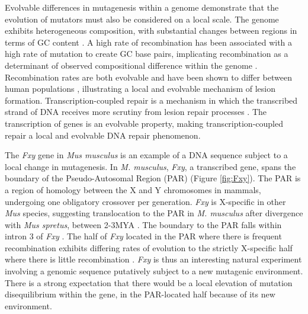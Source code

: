 Evolvable differences in mutagenesis within a genome demonstrate that the evolution of mutators must also be considered on a local scale. The genome exhibits heterogeneous composition, with substantial changes between regions in terms of GC content \citep{Bernardi1989TheGenome, Bernardi2000IsochoresVertebrates}. A high rate of recombination has been associated with a high rate of mutation to create GC base pairs, implicating recombination as a determinant of observed compositional difference within the genome \citep{Montoya-Burgos2003RecombinationGenomes, Duret2006AEvolution}. Recombination rates are both evolvable and have been shown to differ between human populations \citep{Wegmann2011RecombinationInference}, illustrating a local and evolvable mechanism of lesion formation. Transcription-coupled repair is a mechanism in which the transcribed strand of DNA receives more scrutiny from lesion repair processes \citep{Touchon2003Transcription-coupledGenome}. The transcription of genes is an evolvable property, making transcription-coupled repair a local and evolvable DNA repair phenomenon. 

The \textit{Fxy} gene in \textit{Mus musculus} is an example of a DNA sequence subject to a local change in mutagenesis. In \textit{M. musculus}, \textit{Fxy}, a transcribed gene, spans the boundary of the \gls{Pseudo-Autosomal Region} (PAR) \citep{Palmer1997AMice} (Figure \ref{fig:Fxy}). The PAR is a region of homology between the X and Y chromosomes in mammals, undergoing one obligatory crossover per generation. \textit{Fxy} is X-specific in other \textit{Mus} species, suggesting translocation to the PAR in \textit{M. musculus} after divergence with \textit{Mus spretus}, between 2-3MYA \citep{Huang2005HowMammals}. The boundary to the PAR falls within intron 3 of \textit{Fxy} \citep{Palmer1997AMice}. The half of \textit{Fxy} located in the PAR where there is frequent recombination exhibits differing rates of evolution to the strictly X-specific half where there is little recombination \citep{Perry1999EvolutionaryPosition}. \textit{Fxy} is thus an interesting natural experiment involving a genomic sequence putatively subject to a new mutagenic environment. There is a strong expectation that there would be a local elevation of mutation disequilibrium within the gene, in the PAR-located half because of its new environment. 



